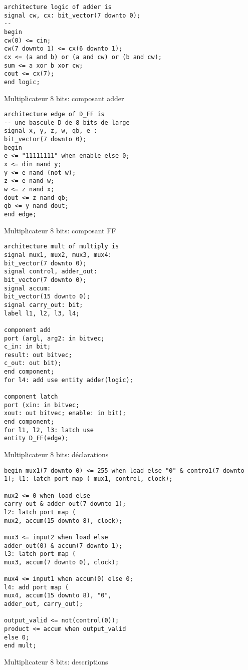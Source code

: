 \documentclass[11pt]{article}
\begin{document}
\begin{listing}[htbp]
\begin{verbatim}
architecture logic of adder is
signal cw, cx: bit_vector(7 downto 0);
--
begin
cw(0) <= cin;
cw(7 downto 1) <= cx(6 downto 1);
cx <= (a and b) or (a and cw) or (b and cw);
sum <= a xor b xor cw;
cout <= cx(7);
end logic;
\end{verbatim}
\caption{Multiplicateur 8 bits: composant adder}
\end{listing}

\begin{listing}[htbp]
\begin{verbatim}
architecture edge of D_FF is
-- une bascule D de 8 bits de large
signal x, y, z, w, qb, e :
bit_vector(7 downto 0);
begin
e <= "11111111" when enable else 0;
x <= din nand y;
y <= e nand (not w);
z <= e nand w;
w <= z nand x;
dout <= z nand qb;
qb <= y nand dout;
end edge;
\end{verbatim}
\caption{Multiplicateur 8 bits: composant FF}
\end{listing}


\begin{listing}[htbp]
\begin{verbatim}
architecture mult of multiply is
signal mux1, mux2, mux3, mux4:
bit_vector(7 downto 0);
signal control, adder_out:
bit_vector(7 downto 0);
signal accum:
bit_vector(15 downto 0);
signal carry_out: bit;
label l1, l2, l3, l4;

component add
port (argl, arg2: in bitvec;
c_in: in bit;
result: out bitvec;
c_out: out bit);
end component;
for l4: add use entity adder(logic);

component latch
port (xin: in bitvec;
xout: out bitvec; enable: in bit);
end component;
for l1, l2, l3: latch use
entity D_FF(edge);
\end{verbatim}
\caption{Multiplicateur 8 bits: déclarations}
\end{listing}


\begin{listing}[htbp]
\begin{verbatim}
begin mux1(7 downto 0) <= 255 when load else "0" & contro1(7 downto
1); l1: latch port map ( mux1, control, clock);

mux2 <= 0 when load else
carry_out & adder_out(7 downto 1);
l2: latch port map (
mux2, accum(15 downto 8), clock);

mux3 <= input2 when load else
adder_out(0) & accum(7 downto 1);
l3: latch port map (
mux3, accum(7 downto 0), clock);

mux4 <= input1 when accum(0) else 0;
l4: add port map (
mux4, accum(15 downto 8), "0",
adder_out, carry_out);

output_valid <= not(control(0));
product <= accum when output_valid
else 0;
end mult;
\end{verbatim}
\caption{Multiplicateur 8 bits: descriptions}
\end{listing}
\end{document}
